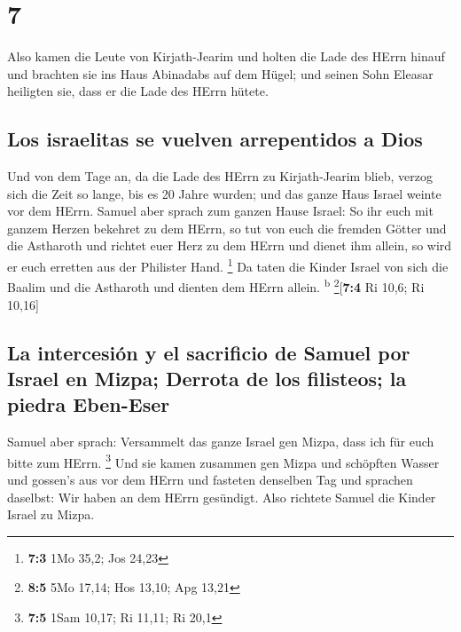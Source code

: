 \hypertarget{section-6}{%
\section{7}\label{section-6}}

 Also kamen die Leute von Kirjath-Jearim und holten die
Lade des HErrn hinauf und brachten sie ins Haus Abinadabs auf dem Hügel;
und seinen Sohn Eleasar heiligten sie, dass er die Lade des HErrn
hütete.

\hypertarget{los-israelitas-se-vuelven-arrepentidos-a-dios}{%
\subsection{Los israelitas se vuelven arrepentidos a
Dios}\label{los-israelitas-se-vuelven-arrepentidos-a-dios}}

 Und von dem Tage an, da die Lade des HErrn zu
Kirjath-Jearim blieb, verzog sich die Zeit so lange, bis es 20 Jahre
wurden; und das ganze Haus Israel weinte vor dem HErrn. 
Samuel aber sprach zum ganzen Hause Israel: So ihr euch mit ganzem
Herzen bekehret zu dem HErrn, so tut von euch die fremden Götter und die
Astharoth und richtet euer Herz zu dem HErrn und dienet ihm allein, so
wird er euch erretten aus der Philister Hand. \footnote{\textbf{7:3} 1Mo
  35,2; Jos 24,23}  Da taten die Kinder Israel von sich
die Baalim und die Astharoth und dienten dem HErrn allein.
\textsuperscript{b} \footnote{\textbf{8:5} 5Mo 17,14; Hos 13,10; Apg
  13,21}{[}\textbf{7:4} Ri 10,6; Ri 10,16{]}

\hypertarget{la-intercesiuxf3n-y-el-sacrificio-de-samuel-por-israel-en-mizpa-derrota-de-los-filisteos-la-piedra-eben-eser}{%
\subsection{La intercesión y el sacrificio de Samuel por Israel en
Mizpa; Derrota de los filisteos; la piedra
Eben-Eser}\label{la-intercesiuxf3n-y-el-sacrificio-de-samuel-por-israel-en-mizpa-derrota-de-los-filisteos-la-piedra-eben-eser}}

 Samuel aber sprach: Versammelt das ganze Israel gen
Mizpa, dass ich für euch bitte zum HErrn. \footnote{\textbf{7:5} 1Sam
  10,17; Ri 11,11; Ri 20,1}  Und sie kamen zusammen gen
Mizpa und schöpften Wasser und gossen's aus vor dem HErrn und fasteten
denselben Tag und sprachen daselbst: Wir haben an dem HErrn gesündigt.
Also richtete Samuel die Kinder Israel zu Mizpa.

